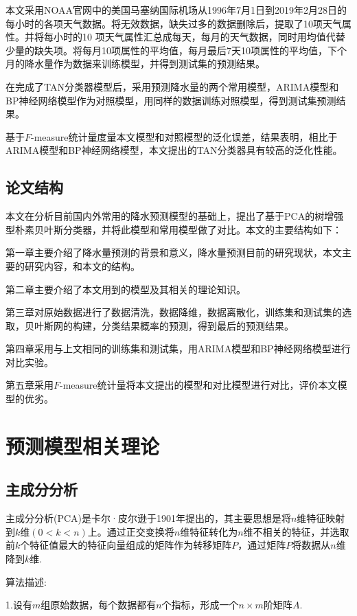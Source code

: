 \documentclass{ctexart}
\begin{document}
本文采用NOAA官网中的美国马塞纳国际机场从1996年7月1日到2019年2月28日的每小时的各项天气数据。将无效数据，缺失过多的数据删除后，提取了10项天气属性。并将每小时的10 项天气属性汇总成每天，每月的天气数据，同时用均值代替少量的缺失项。将每月10项属性的平均值，每月最后7天10项属性的平均值，下个月的降水量作为数据来训练模型，并得到测试集的预测结果。

在完成了TAN分类器模型后，采用预测降水量的两个常用模型，ARIMA模型和BP神经网络模型作为对照模型，用同样的数据训练对照模型，得到测试集预测结果。

基于$F$-measure统计量度量本文模型和对照模型的泛化误差，结果表明，相比于ARIMA模型和BP神经网络模型，本文提出的TAN分类器具有较高的泛化性能。


\subsection{论文结构}

本文在分析目前国内外常用的降水预测模型的基础上，提出了基于PCA的树增强型朴素贝叶斯分类器，并将此模型和常用模型做了对比。本文的主要结构如下：

第一章主要介绍了降水量预测的背景和意义，降水量预测目前的研究现状，本文主要的研究内容，和本文的结构。

第二章主要介绍了本文用到的模型及其相关的理论知识。

第三章对原始数据进行了数据清洗，数据降维，数据离散化，训练集和测试集的选取，贝叶斯网的构建，分类结果概率的预测，得到最后的预测结果。

第四章采用与上文相同的训练集和测试集，用ARIMA模型和BP神经网络模型进行对比实验。

第五章采用$F$-measure统计量将本文提出的模型和对比模型进行对比，评价本文模型的优劣。

\newpage
\section{预测模型相关理论}

\subsection{主成分分析}

主成分分析(PCA)是卡尔·皮尔逊于1901年提出的，其主要思想是将$n$维特征映射到$k$维$(0<k<n)$上。通过正交变换将$n$维特征转化为$n$维不相关的特征，并选取前$k$个特征值最大的特征向量组成的矩阵作为转移矩阵$P$，通过矩阵$P$将数据从$n$维降到$k$维.

算法描述:

1.设有$m$组原始数据，每个数据都有$n$个指标，形成一个$n\times m$阶矩阵$A$.
\end{document}
